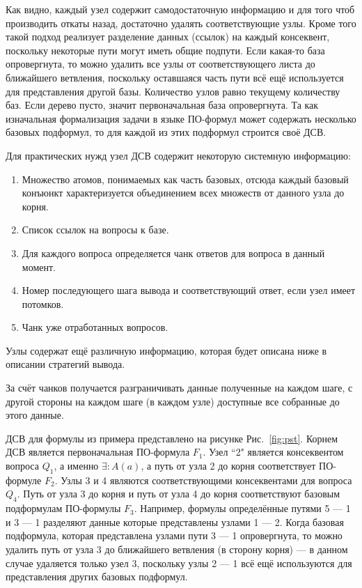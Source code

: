 Как видно, каждый узел содержит самодостаточную информацию и для того чтоб производить откаты назад, достаточно удалять соответствующие узлы.
Кроме того такой подход реализует разделение данных (ссылок) на каждый консеквент, поскольку некоторые пути могут иметь общие подпути.
Если какая-то база опровергнута, то можно удалить все узлы от соответствующего листа до ближайшего ветвления, поскольку оставшаяся часть пути всё ещё используется для представления другой базы. Количество узлов равно текущему количеству баз. Если дерево пусто, значит первоначальная база опровергнута. 
Та как изначальная формализация задачи в языке ПО-формул может содержать несколько базовых подформул, то для каждой из этих подформул строится своё ДСВ.

Для практических нужд узел ДСВ содержит некоторую системную информацию: 
\begin{enumerate}
\item Множество атомов, понимаемых как часть базовых, отсюда каждый базовый конъюнкт характеризуется объединением всех множеств от данного узла до корня.
\item Список ссылок на вопросы к базе.
\item Для каждого вопроса определяется чанк ответов для вопроса в данный момент. 
\item Номер последующего шага вывода и соответствующий ответ, если узел имеет потомков.
\item Чанк уже отработанных вопросов.
\end{enumerate}

Узлы содержат ещё различную информацию, которая будет описана ниже в описании стратегий вывода.

За счёт чанков получается разграничивать данные полученные на каждом шаге, с другой стороны на каждом шаге (в каждом узле) доступные все собранные до этого данные.

ДСВ для формулы из примера представлено на рисунке Рис.~\ref{fig:pst}.
Корнем ДСВ является первоначальная ПО-формула $F_1$. Узел ``2" является консеквентом вопроса $Q_1$, а именно $\exists\colon A(a)$, а путь от узла 2 до корня соответствует ПО-формуле $F_2$. Узлы 3 и 4 являются соответствующими консеквентами для вопроса $Q_4$. Путь от узла 3 до корня и путь от узла 4 до корня соответствуют базовым подформулам ПО-формулы $F_3$. Например, формулы определённые путями 5 --- 1 и 3 --- 1 разделяют данные которые представлены узлами 1 --- 2. Когда базовая подформула, которая представлена узлами пути 3 --- 1 опровергнута, то можно удалить путь от узла 3 до ближайшего ветвления (в сторону корня) --- в данном случае удаляется только узел 3, поскольку узлы 2 --- 1 всё ещё используются для представления других базовых подформул. 

